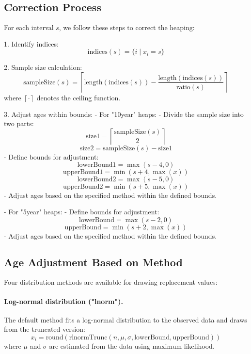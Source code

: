 \documentclass[pdflatex,sn-mathphys-num]{sn-jnl}%
\theoremstyle{thmstyleone}%
\theoremstyle{thmstyletwo}%
\theoremstyle{thmstylethree}%
\begin{document}
\subsection{Correction Process}

For each interval \( s \), we follow these steps to correct the heaping:

1. Identify indices:
   \[
   \text{indices}(s) = \{i \mid x_i = s\}
   \]

2. Sample size calculation:
   \[
   \text{sampleSize}(s) = \left\lceil \text{length}(\text{indices}(s)) - \frac{\text{length}(\text{indices}(s))}{\text{ratio}(s)} \right\rceil
   \]
   where \( \left\lceil \cdot \right\rceil \) denotes the ceiling function.

3. Adjust ages within bounds:
   - For "10year" heaps:
     - Divide the sample size into two parts:
       \[
       \text{size1} = \left\lceil \frac{\text{sampleSize}(s)}{2} \right\rceil
       \]
       \[
       \text{size2} = \text{sampleSize}(s) - \text{size1}
       \]
     - Define bounds for adjustment:
       \[
       \text{lowerBound1} = \max(s - 4, 0)
       \]
       \[
       \text{upperBound1} = \min(s + 4, \max(x))
       \]
       \[
       \text{lowerBound2} = \max(s - 5, 0)
       \]
       \[
       \text{upperBound2} = \min(s + 5, \max(x))
       \]
     - Adjust ages based on the specified method within the defined bounds.

   - For "5year" heaps:
     - Define bounds for adjustment:
       \[
       \text{lowerBound} = \max(s - 2, 0)
       \]
       \[
       \text{upperBound} = \min(s + 2, \max(x))
       \]
     - Adjust ages based on the specified method within the defined bounds.

\subsection{Age Adjustment Based on Method}

Four distribution methods are available for drawing replacement values:

\paragraph{Log-normal distribution ("lnorm").} The default method fits a log-normal distribution to the observed data and draws from the truncated version:
  \[
  x_i = \text{round}(\text{rlnormTrunc}(n, \mu, \sigma, \text{lowerBound}, \text{upperBound}))
  \]
where $\mu$ and $\sigma$ are estimated from the data using maximum likelihood.
\end{document}
